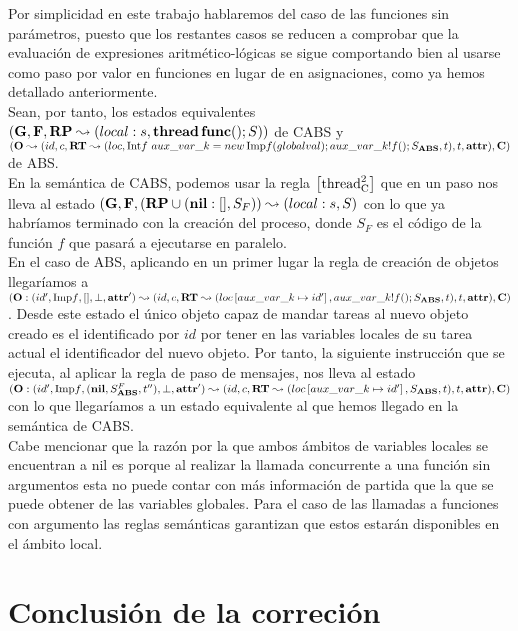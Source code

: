 Por simplicidad en este trabajo hablaremos del caso de las funciones sin parámetros, puesto que los restantes casos se reducen a comprobar que la evaluación de expresiones aritmético-lógicas se sigue comportando bien al usarse como paso por valor en funciones en lugar de en asignaciones, como ya hemos detallado anteriormente.\\

Sean, por tanto, los estados equivalentes $(\mathbf{G}, \mathbf{F}, \textbf{RP} \leadsto (local:s, \textbf{thread} \,\textbf{func}()\mbox{;\,}S))$ de CABS y $(\mathbf{O} \leadsto (id, c, \textbf{RT} \leadsto (loc,  \mbox{Int$f$ } aux\_var\_k = new\, \mbox{Imp$f$}(globalval)\mbox{;\,} aux\_var\_k!f()\mbox{;\,} S_{\textbf{ABS}}, t), t, \textbf{attr}), \mathbf{C})$ de ABS.\\

En la semántica de CABS, podemos usar la regla $\left[ \text{thread}_{\text{C}}^2 \right]$ que en un paso nos lleva al estado $(\mathbf{G}, \mathbf{F}, (\textbf{RP} \cup (\textbf{nil}:[], S_F)) \leadsto (local:s, S)$ con lo que ya habríamos terminado con la creación del proceso, donde $S_F$ es el código de la función $f$ que pasará a ejecutarse en paralelo.\\

En el caso de ABS, aplicando en un primer lugar la regla de creación de objetos llegaríamos a $(\mathbf{O}:(id', \mbox{Imp$f$}, [], \perp, \textbf{attr}') \leadsto (id, c, \textbf{RT} \leadsto (loc \left[ aux\_var\_k\mapsto id' \right], aux\_var\_k!f()\mbox{;\,} S_{\textbf{ABS}}, t), t, \textbf{attr}), \mathbf{C})$. Desde este estado el único objeto capaz de mandar tareas al nuevo objeto creado es el identificado por $id$ por tener en las variables locales de su tarea actual el identificador del nuevo objeto. Por tanto, la siguiente instrucción que se ejecuta, al aplicar la regla de paso de mensajes, nos lleva al estado $(\mathbf{O}:(id', \mbox{Imp$f$}, (\textbf{nil}, S_{\textbf{ABS}}^F, t''), \perp, \textbf{attr}') \leadsto (id, c, \textbf{RT} \leadsto (loc \left[ aux\_var\_k\mapsto id' \right], S_{\textbf{ABS}}, t), t, \textbf{attr}), \mathbf{C})$ con lo que llegaríamos a un estado equivalente al que hemos llegado en la semántica de CABS.\\

Cabe mencionar que la razón por la que ambos ámbitos de variables locales se encuentran a nil es porque al realizar la llamada concurrente a una función sin argumentos esta no puede contar con más información de partida que la que se puede obtener de las variables globales. Para el caso de las llamadas a funciones con argumento las reglas semánticas garantizan que estos estarán disponibles en el ámbito local.

\section{Conclusión de la correción}

